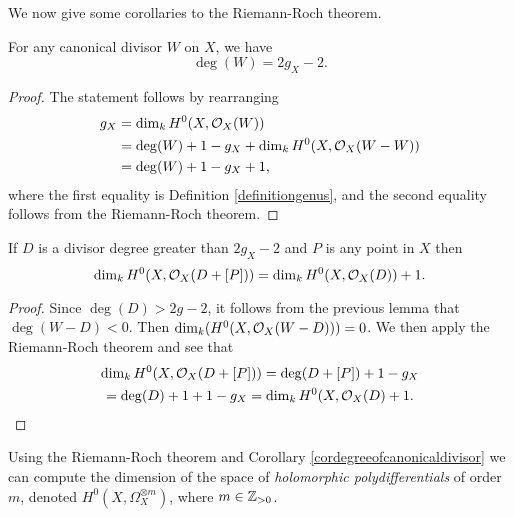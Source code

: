 We now give some corollaries to the Riemann-Roch theorem.

    \begin{cor}\label{cordegreeofcanonicaldivisor}
    For any canonical divisor $W$ on $X$, we have 
        \[
        \deg(W) = 2g_X-2.
        \]
    \end{cor}
    \begin{proof}
    The statement follows by rearranging
        \begin{align*}
        g_X & = \dim_k H^0(X,{\cal O}_X(W))  \\ & = \deg(W) + 1 -g_X +  \dim_k H^0(X,{\cal O}_X(W-W))\\ & = \deg(W) + 1 -g_X + 1,
        \end{align*}
    where the first equality is Definition \ref{definitiongenus}, and the second equality follows from the Riemann-Roch theorem.
    \end{proof}

    \begin{cor}
    If $D$ is a divisor degree greater than $2g_X-2$ and $P$ is any point in $X$ then
        \[
        \dim_k H^0(X,{\cal O}_X(D +[P])) = \dim_k H^0(X,{\cal O}_X(D)) + 1.
        \]
    \end{cor}
    \begin{proof}
    Since $\deg(D) > 2g-2$, it follows from the previous lemma that $\deg(W-D) <0$.
    Then $\dim_k(H^0(X,{\cal O}_X(W - D)))  = 0$.
    We then apply the Riemann-Roch theorem and see that
        \begin{multline*}
        \dim_k H^0(X,{\cal O}_X(D + [P])) = \deg(D +[P]) + 1 - g_X \\ = \deg(D) + 1 + 1 - g_X = \dim_k H^0(X,{\cal O}_X(D) + 1.
        \end{multline*}
    \end{proof}

Using the Riemann-Roch theorem and Corollary \ref{cordegreeofcanonicaldivisor} we can compute the dimension of the space of \emph{holomorphic polydifferentials} of order $m$, denoted $H^0(X,\Omega_X^{\otimes m})$, where $m \in {\mathbb Z}_{> 0}$.

